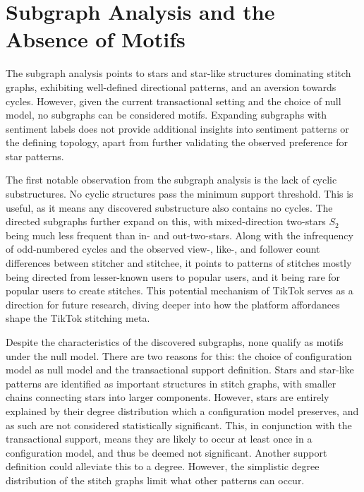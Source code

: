 




\section{Subgraph Analysis and the Absence of Motifs}
The subgraph analysis points to stars and star-like structures dominating stitch graphs, exhibiting well-defined directional patterns, and an aversion towards cycles. However, given the current transactional setting and the choice of null model, no subgraphs can be considered motifs. Expanding subgraphs with sentiment labels does not provide additional insights into sentiment patterns or the defining topology, apart from further validating the observed preference for star patterns.

The first notable observation from the subgraph analysis is the lack of cyclic substructures. No cyclic structures pass the minimum support threshold. This is useful, as it means any discovered substructure also contains no cycles. The directed subgraphs further expand on this, with mixed-direction two-stars $S_2$ being much less frequent than in- and out-two-stars. Along with the infrequency of odd-numbered cycles and the observed view-, like-, and follower count differences between stitcher and stitchee, it points to patterns of stitches mostly being directed from lesser-known users to popular users, and it being rare for popular users to create stitches. This potential mechanism of TikTok serves as a direction for future research, diving deeper into how the platform affordances shape the TikTok stitching meta. 

Despite the characteristics of the discovered subgraphs, none qualify as motifs under the null model. There are two reasons for this: the choice of configuration model as null model and the transactional support definition. Stars and star-like patterns are identified as important structures in stitch graphs, with smaller chains connecting stars into larger components. However, stars are entirely explained by their degree distribution which a configuration model preserves, and as such are not considered statistically significant. This, in conjunction with the transactional support, means they are likely to occur at least once in a configuration model, and thus be deemed not significant. Another support definition could alleviate this to a degree. However, the simplistic degree distribution of the stitch graphs limit what other patterns can occur. 


